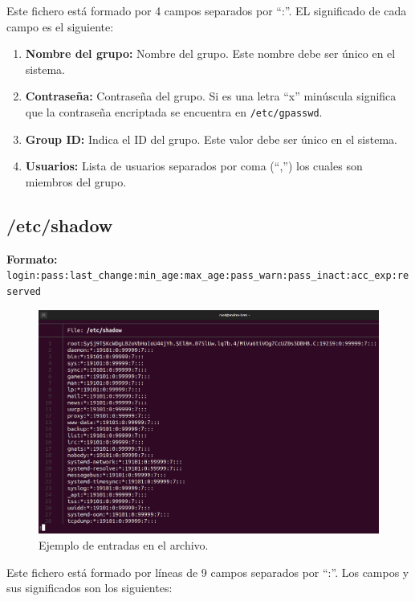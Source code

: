 \documentclass{article}
\begin{document}
\bigskip

Este fichero está formado por 4 campos separados por ``:''. EL significado de cada campo es el siguiente:

\begin{enumerate}
    \item \textbf{Nombre del grupo: }Nombre del grupo. Este nombre debe ser único en el sistema.
    
    \item \textbf{Contraseña: }Contraseña del grupo. Si es una letra ``x'' minúscula significa que la contraseña encriptada se encuentra en \verb|/etc/gpasswd|.
    \item \textbf{Group ID: }Indica el ID del grupo. Este valor debe ser único en el sistema.
    \item \textbf{Usuarios: }Lista de usuarios separados por coma (``,'') los cuales son miembros del grupo. 
\end{enumerate}

\newpage

\subsection{/etc/shadow}
\textbf{Formato: }\verb|login:pass:last_change:min_age:max_age:pass_warn:pass_inact:acc_exp:reserved|

\begin{figure}[H]
    \includegraphics[width=\textwidth]{imagenes/shadowfile.png}
    \caption{Ejemplo de entradas en el archivo.}    
\end{figure}

\bigskip

Este fichero está formado por líneas de 9 campos separados por ``:''. Los campos y sus significados son los siguientes:
\end{document}
